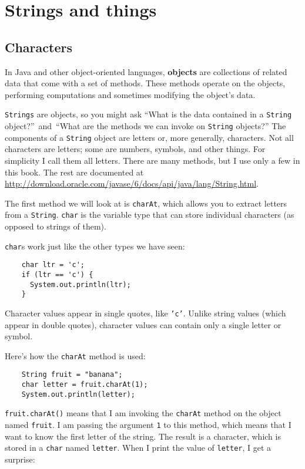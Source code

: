 \chapter{Strings and things}
\label{chap07}
\label{strings}

\section{Characters}

In Java and other object-oriented languages, {\bf objects} are collections
of related data that come with a set of methods.  These methods
operate on the objects, performing computations and sometimes
modifying the object's data.

{\tt Strings} are objects,
so you might ask ``What is the data
contained in a {\tt String} object?''~and~``What are the methods we
can invoke on {\tt String} objects?''
%
The components of a {\tt String} object are letters or, more generally,
characters.  Not all characters are letters; some are numbers,
symbols, and other things.  For simplicity I
call them all letters.
%
There are many methods, but I use only a few in this
book.  The rest are documented at
\url{http://download.oracle.com/javase/6/docs/api/java/lang/String.html}.

The first method we will look at is {\tt charAt}, which allows you to
extract letters from a {\tt String}.
{\tt char} is the variable type that can store
individual characters (as opposed to strings of them).


{\tt char}s work just like the other types we have seen:

\begin{lstlisting}
    char ltr = 'c';
    if (ltr == 'c') {
      System.out.println(ltr);
    }
\end{lstlisting}
%
Character values appear in single quotes, like {\tt 'c'}.  Unlike
string values (which appear in double quotes), character values
can contain only a single letter or symbol.


Here's how the {\tt charAt} method is used:

\begin{lstlisting}
    String fruit = "banana";
    char letter = fruit.charAt(1);
    System.out.println(letter);
\end{lstlisting}
%
{\tt fruit.charAt()} means that I am
invoking the {\tt charAt} method on the object named
{\tt fruit}.
I am passing the argument {\tt 1} to this method,
which means that I want to know the first letter of
the string.  The result is a character, which is stored in a
{\tt char} named {\tt letter}.  When I print the value of
{\tt letter}, I get a surprise:

